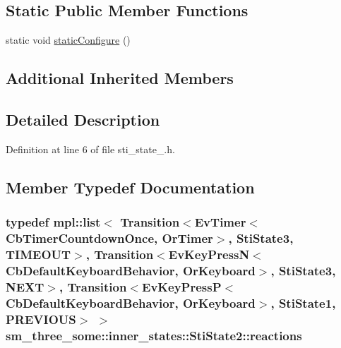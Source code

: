 \subsection*{Static Public Member Functions}
\begin{DoxyCompactItemize}
\item 
static void \hyperlink{structsm__three__some_1_1inner__states_1_1StiState2_a52ec97e0ac51c91508349adf358045ea}{static\+Configure} ()
\end{DoxyCompactItemize}
\subsection*{Additional Inherited Members}


\subsection{Detailed Description}


Definition at line 6 of file sti\+\_\+state\+\_.\+h.



\subsection{Member Typedef Documentation}
\subsubsection[{\texorpdfstring{reactions}{reactions}}]{\setlength{\rightskip}{0pt plus 5cm}typedef mpl\+::list$<$ Transition$<$Ev\+Timer$<$Cb\+Timer\+Countdown\+Once, {\bf Or\+Timer}$>$, {\bf Sti\+State3}, {\bf T\+I\+M\+E\+O\+UT}$>$, Transition$<$Ev\+Key\+PressN$<$Cb\+Default\+Keyboard\+Behavior, {\bf Or\+Keyboard}$>$, {\bf Sti\+State3}, {\bf N\+E\+XT}$>$, Transition$<$Ev\+Key\+PressP$<$Cb\+Default\+Keyboard\+Behavior, {\bf Or\+Keyboard}$>$, {\bf Sti\+State1}, {\bf P\+R\+E\+V\+I\+O\+US}$>$ $>$ {\bf sm\+\_\+three\+\_\+some\+::inner\+\_\+states\+::\+Sti\+State2\+::reactions}}\hypertarget{structsm__three__some_1_1inner__states_1_1StiState2_a35556a3ab61ab56f2aa5d896b8330082}{}\label{structsm__three__some_1_1inner__states_1_1StiState2_a35556a3ab61ab56f2aa5d896b8330082}


